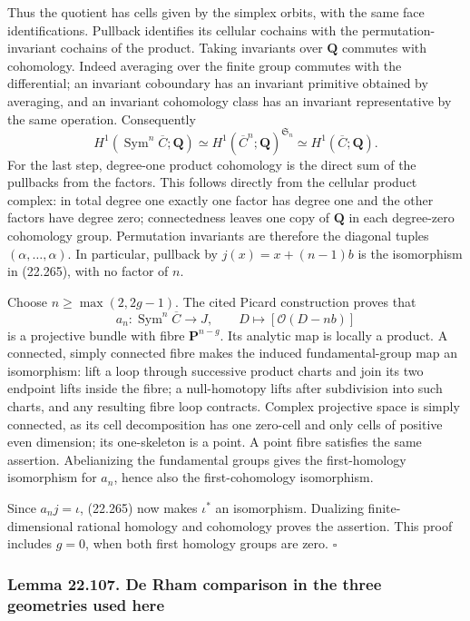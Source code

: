 \documentclass[
  11pt,
  a4paper,
]{article}
\begin{document}
Thus the quotient has cells given by the simplex orbits, with the same
face identifications. Pullback identifies its cellular cochains with the
permutation-invariant cochains of the product. Taking invariants over
\(\mathbf Q\) commutes with cohomology. Indeed averaging over the finite
group commutes with the differential; an invariant coboundary has an
invariant primitive obtained by averaging, and an invariant cohomology
class has an invariant representative by the same operation.
Consequently \[
 H^1(\operatorname{Sym}^n\overline C;\mathbf Q)
    \simeq H^1(\overline C^n;\mathbf Q)^{\mathfrak S_n}
    \simeq H^1(\overline C;\mathbf Q).
 \tag{22.265}
\] For the last step, degree-one product cohomology is the direct sum of
the pullbacks from the factors. This follows directly from the cellular
product complex: in total degree one exactly one factor has degree one
and the other factors have degree zero; connectedness leaves one copy of
\(\mathbf Q\) in each degree-zero cohomology group. Permutation
invariants are therefore the diagonal tuples \((\alpha,\ldots,\alpha)\).
In particular, pullback by \(j(x)=x+(n-1)b\) is the isomorphism in
(22.265), with no factor of \(n\).

Choose \(n\ge\max(2,2g-1)\). The cited Picard construction proves that
\[
 a_n:\operatorname{Sym}^n\overline C\longrightarrow J,\qquad
              D\longmapsto[\mathcal O(D-nb)]
 \tag{22.266}
\] is a projective bundle with fibre \(\mathbf P^{n-g}\). Its analytic
map is locally a product. A connected, simply connected fibre makes the
induced fundamental-group map an isomorphism: lift a loop through
successive product charts and join its two endpoint lifts inside the
fibre; a null-homotopy lifts after subdivision into such charts, and any
resulting fibre loop contracts. Complex projective space is simply
connected, as its cell decomposition has one zero-cell and only cells of
positive even dimension; its one-skeleton is a point. A point fibre
satisfies the same assertion. Abelianizing the fundamental groups gives
the first-homology isomorphism for \(a_n\), hence also the
first-cohomology isomorphism.

Since \(a_nj=\iota\), (22.265) now makes \(\iota^*\) an isomorphism.
Dualizing finite-dimensional rational homology and cohomology proves the
assertion. This proof includes \(g=0\), when both first homology groups
are zero. \(\square\)

\subsubsection{Lemma 22.107. De Rham comparison in the three geometries
used
here}\label{lemma-22.107.-de-rham-comparison-in-the-three-geometries-used-here}
\end{document}
